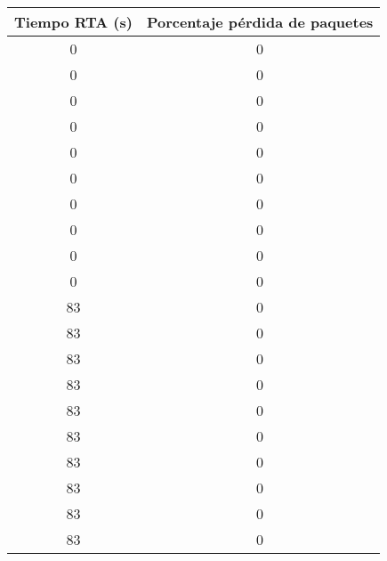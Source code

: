 \begin{table}[]
	\centering
	\begin{tabular}{|c|c|}
		\hline
		\textbf{Tiempo RTA (s)} & \textbf{Porcentaje pérdida de paquetes} \\ \hline
		0                       & 0                                       \\ \hline
		0                       & 0                                       \\ \hline
		0                       & 0                                       \\ \hline
		0                       & 0                                       \\ \hline
		0                       & 0                                       \\ \hline
		0                       & 0                                       \\ \hline
		0                       & 0                                       \\ \hline
		0                       & 0                                       \\ \hline
		0                       & 0                                       \\ \hline
		0                       & 0                                       \\ \hline
		83                      & 0                                       \\ \hline
		83                      & 0                                       \\ \hline
		83                      & 0                                       \\ \hline
		83                      & 0                                       \\ \hline
		83                      & 0                                       \\ \hline
		83                      & 0                                       \\ \hline
		83                      & 0                                       \\ \hline
		83                      & 0                                       \\ \hline
		83                      & 0                                       \\ \hline
		83                      & 0                                       \\ \hline

\end{tabular}
\end{table}
